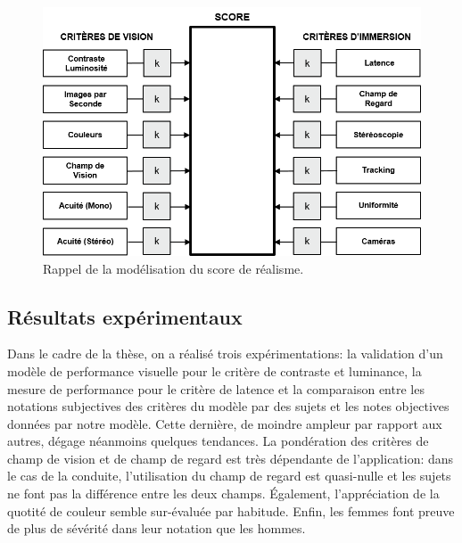	\begin{figure}[h]
		\centering
		\includegraphics[scale=1]{Figures/ScoreRealismeMini}
		\caption{Rappel de la modélisation du score de réalisme.}
		\label{fig:score_realisme_mini}
	\end{figure}
	
	\subsection*{Résultats expérimentaux}
	\par Dans le cadre de la thèse, on a réalisé trois expérimentations: la validation d'un modèle de performance visuelle pour le critère de contraste et luminance, la mesure de performance pour le critère de latence et la comparaison entre les notations subjectives des critères du modèle par des sujets et les notes objectives données par notre modèle. Cette dernière, de moindre ampleur par rapport aux autres, dégage néanmoins quelques tendances. La pondération des critères de champ de vision et de champ de regard est très dépendante de l'application: dans le cas de la conduite, l'utilisation du champ de regard est quasi-nulle et les sujets ne font pas la différence entre les deux champs. Également, l'appréciation de la quotité de couleur semble sur-évaluée par habitude. Enfin, les femmes font preuve de plus de sévérité dans leur notation que les hommes.
	
